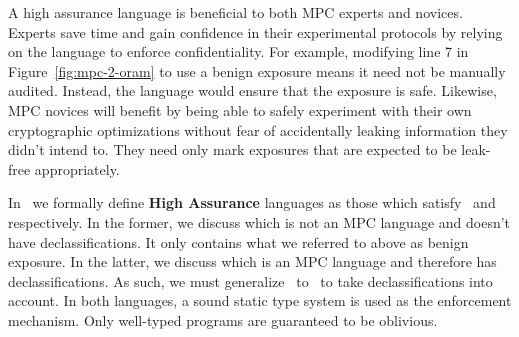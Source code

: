 A high assurance language is beneficial to both MPC experts and novices. Experts save time and gain confidence in their
experimental protocols by relying on the language to enforce confidentiality. For example, modifying line 7 in
Figure~\ref{fig:mpc-2-oram} to use a benign exposure means it need not be manually audited. Instead, the language would ensure that the
exposure is safe. Likewise, MPC novices will benefit by being able to safely experiment with their own cryptographic optimizations
without fear of accidentally leaking information they didn't intend to. They need only mark exposures that are expected to be
leak-free appropriately.

In~ we formally define \textbf{High Assurance} languages as those which satisfy~ and~
respectively. In the former, we discuss \obliv which is not an MPC language and doesn't have declassifications. It only contains what we referred to above
as benign exposure. In the latter, we discuss \lang which is an MPC language and therefore has declassifications. As such, we must generalize~
to~ to take declassifications into account. In both languages, a sound static type system is used as the enforcement mechanism. Only well-typed
programs are guaranteed to be oblivious.

